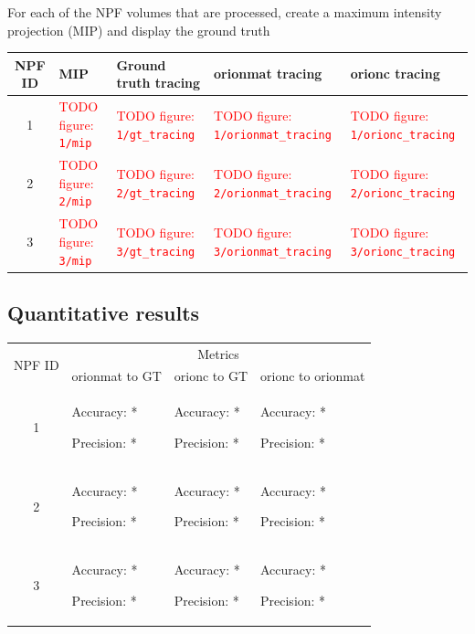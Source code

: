 \documentclass[12pt]{article}
\newcommand{\todofig}[1]{%
	\textcolor{red}{TODO figure: \nolinkurl{#1}}%
}
\begin{document}
For each of the NPF volumes that are processed, create a maximum
intensity projection (MIP) and display the ground truth
\begin{center}
\renewcommand{\arraystretch}{1.5}%
\begin{tabular}{cp{}p{}p{}p{}}
	\toprule
	\be NPF ID & \be MIP & \be Ground truth tracing & \be \gls{orionmat} tracing & \be \gls{orionc} tracing \\
	\midrule
	1      & \todofig{1/mip} & \todofig{1/gt_tracing} & \todofig{1/orionmat_tracing} & \todofig{1/orionc_tracing} \\%
	2      & \todofig{2/mip} & \todofig{2/gt_tracing} & \todofig{2/orionmat_tracing} & \todofig{2/orionc_tracing} \\%
	3      & \todofig{3/mip} & \todofig{3/gt_tracing} & \todofig{3/orionmat_tracing} & \todofig{3/orionc_tracing} \\
	\bottomrule
\end{tabular}
\end{center}

\subsection{Quantitative results}

\begin{center}
\renewcommand{\arraystretch}{1.5}%
\begin{tabular}{cp{}p{}p{}}
	\toprule
	\multirow{2}{*}{\be NPF ID } & \multicolumn{3}{c}{\be Metrics} \\
				  & \multicolumn{1}{c}{\be \gls{orionmat} to GT} & \multicolumn{1}{c}{\be \gls{orionc} to GT} & \multicolumn{1}{c}{\be \gls{orionc} to \gls{orionmat}} \\
	\midrule
		1  & Accuracy: * \par Precision: * & Accuracy: * \par Precision: * & Accuracy: * \par Precision: * \\%
		2  & Accuracy: * \par Precision: * & Accuracy: * \par Precision: * & Accuracy: * \par Precision: * \\%
		3  & Accuracy: * \par Precision: * & Accuracy: * \par Precision: * & Accuracy: * \par Precision: * \\
	\bottomrule
\end{tabular}
\end{center}
\end{document}
